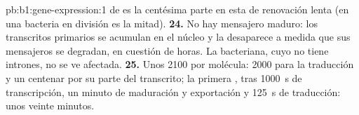 \begin{solution}{pb:b1:gene-expression:1}
de  es la centésima parte en esta  de renovación lenta (en
una bacteria en división es la mitad).
\textbf{24.} No hay mensajero maduro: los transcritos primarios se acumulan
en el núcleo y la  desaparece a medida que sus mensajeros se
degradan, en cuestión de horas. La  bacteriana, cuyo  no tiene
intrones, no se ve afectada.
\textbf{25.} Unos 2100  por molécula: 2000 para la traducción y un
centenar por su parte del transcrito; la primera , tras
\qty{1000}{s} de transcripción, un minuto de maduración y exportación y
\qty{125}{s} de traducción: unos veinte minutos.
\end{solution}
